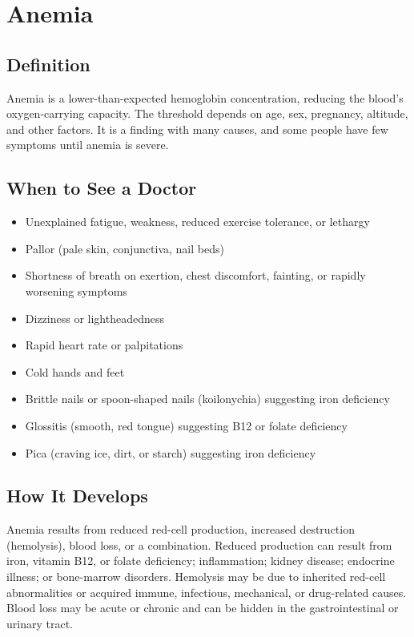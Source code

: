\chapter{Anemia}

\section*{Definition}
Anemia is a lower-than-expected hemoglobin concentration, reducing the blood's oxygen-carrying capacity. The threshold depends on age, sex, pregnancy, altitude, and other factors. It is a finding with many causes, and some people have few symptoms until anemia is severe.

\section*{When to See a Doctor}
\begin{itemize}
\item Unexplained fatigue, weakness, reduced exercise tolerance, or lethargy
\item Pallor (pale skin, conjunctiva, nail beds)
\item Shortness of breath on exertion, chest discomfort, fainting, or rapidly worsening symptoms
\item Dizziness or lightheadedness
\item Rapid heart rate or palpitations
\item Cold hands and feet
\item Brittle nails or spoon-shaped nails (koilonychia) suggesting iron deficiency
\item Glossitis (smooth, red tongue) suggesting B12 or folate deficiency
\item Pica (craving ice, dirt, or starch) suggesting iron deficiency
\end{itemize}

\section*{How It Develops}
Anemia results from reduced red-cell production, increased destruction (hemolysis), blood loss, or a combination. Reduced production can result from iron, vitamin B12, or folate deficiency; inflammation; kidney disease; endocrine illness; or bone-marrow disorders. Hemolysis may be due to inherited red-cell abnormalities or acquired immune, infectious, mechanical, or drug-related causes. Blood loss may be acute or chronic and can be hidden in the gastrointestinal or urinary tract.

